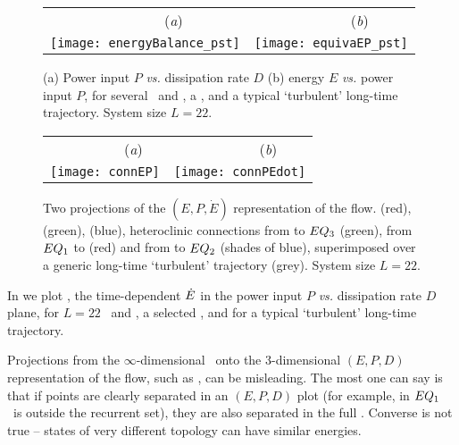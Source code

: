\begin{figure}[t]
\begin{center}
 \begin{tabular}{cc}
        ~~~~~~~~(\textit{a})                        &   ~~~~~~~~(\textit{b}) \\
    \texttt{[image: energyBalance\_pst]}
    & \texttt{[image: equivaEP\_pst]}

  \end{tabular}
\end{center}
\caption{
(a) Power input $P$ {\em vs.}
dissipation rate $D$
(b) energy $E$  {\em vs.}
power input $P$,   for several  \eqva\ and \reqva,
a \rpo, and a typical `turbulent' long-time trajectory.
System size $L=22$.
        }
\label{f:drivedrag1}
\end{figure}

\begin{figure}[t]
\begin{center}
 \begin{tabular}{cc}
        ~~~~~~~~(\textit{a})                        &   ~~~~~~~~(\textit{b}) \\
    \texttt{[image: connEP]}
     & \texttt{[image: connPEdot]}
 \end{tabular}
\end{center}
\caption{
Two projections of the $(E,P,\dot{E})$ representation of the flow.
 (red),  (green),  (blue),
heteroclinic connections from  to $EQ_{3}$ (green),
from $EQ_{1}$ to  (red)
and from  to $EQ_{2}$ (shades of blue), superimposed over
a generic long-time `turbulent' trajectory (grey).
System size $L=22$.
        }
\label{f:drivedragConn}
\end{figure}

In  we plot , the time-dependent
$\dot{E}$ in the power input $P$ {\em vs.}
dissipation rate $D$ plane, for $L=22$ \eqva\ and \reqva,
a selected \rpo, and for a typical `turbulent' long-time
trajectory.

Projections from the $\infty$-dimensional \statesp\ onto the 3-dimensional
$(E,P,D)$ representation of the flow, such as
, can be misleading.
The most one can say is that if points are clearly separated in an
$(E,P,D)$ plot (for example, in 
$EQ_{1}$ \eqv\ is outside the recurrent set), they are also separated
in the full \statesp.  Converse is not true -- states of
very different topology can have similar energies.

